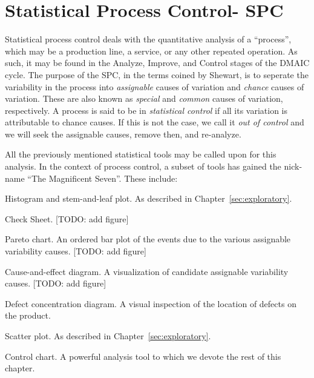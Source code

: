 \chapter{Statistical Process Control- SPC}
\label{sec:spc}

Statistical process control deals with the quantitative analysis of a ``process'', which may be a production line, a service, or any other repeated operation.
As such, it may be found in the Analyze, Improve, and Control stages of the DMAIC cycle.
The purpose of the SPC, in the terms coined by Shewart, is to seperate the variability in the process into \emph{assignable} causes of variation and \emph{chance} causes of variation.
These are also known as \emph{special} and \emph{common} causes of variation, respectively. 
A process is said to be in \emph{statistical control} if all its variation is attributable to chance causes.
If this is not the case, we call it \emph{out of control} and we will seek the assignable causes, remove then, and   re-analyze.


All the previously mentioned statistical tools may be called upon for this analysis. 
In the context of process control, a subset of tools has gained the nick-name ``The Magnificent Seven''. These include:
\begin{description}
\item Histogram and stem-and-leaf plot. As described in Chapter~\ref{sec:exploratory}.
\item Check Sheet. [TODO: add figure]
\item Pareto chart. An ordered bar plot of the events due to the various assignable variability causes. [TODO: add figure]
\item Cause-and-effect diagram. A visualization of candidate assignable variability causes. [TODO: add figure]
\item Defect concentration diagram. A visual inspection of the location of defects on the product. 
\item Scatter plot. As described in Chapter~\ref{sec:exploratory}.
\item Control chart. A powerful analysis tool to which we devote the rest of this chapter. 
\end{description}







